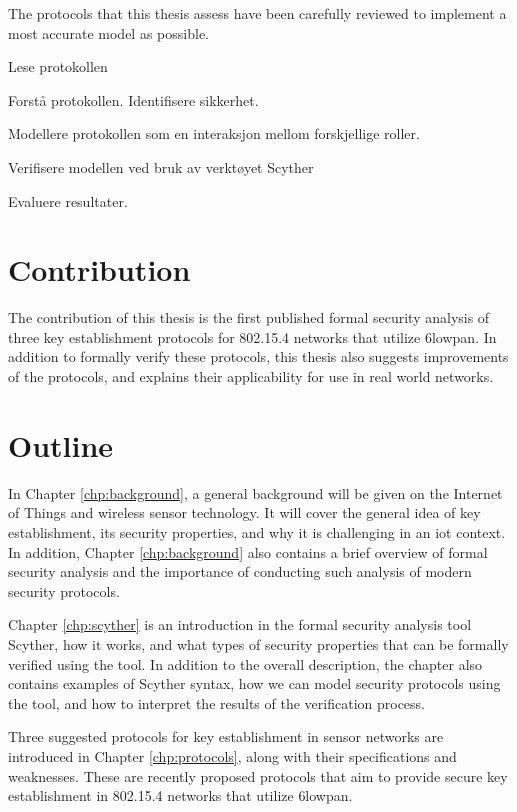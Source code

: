 The protocols that this thesis assess have been carefully reviewed to implement a most accurate model as possible. 



Lese protokollen

Forstå protokollen. Identifisere sikkerhet.

Modellere protokollen som en interaksjon mellom forskjellige roller.

Verifisere modellen ved bruk av verktøyet Scyther

Evaluere resultater.

\section{Contribution}

The contribution of this thesis is the first published formal security analysis of three key establishment protocols for 802.15.4 networks that utilize \gls{6lowpan}. In addition to formally verify these protocols, this thesis also suggests improvements of the protocols, and explains their applicability for use in real world networks.


\section{Outline}

In Chapter \ref{chp:background}, a general background will be given on the Internet of Things and wireless sensor technology. It will cover the general idea of key establishment, its security properties, and why it is challenging in an \gls{iot} context. In addition, Chapter \ref{chp:background} also contains a brief overview of formal security analysis and the importance of conducting such analysis of modern security protocols.

Chapter \ref{chp:scyther} is an introduction in the formal security analysis tool Scyther, how it works, and what types of security properties that can be formally verified using the tool. In addition to the overall description, the chapter also contains examples of Scyther syntax, how we can model security protocols using the tool, and how to interpret the results of the verification process.

Three suggested protocols for key establishment in sensor networks are introduced in Chapter \ref{chp:protocols}, along with their specifications and weaknesses. These are recently proposed protocols that aim to provide secure key establishment in 802.15.4 networks that utilize \gls{6lowpan}.

